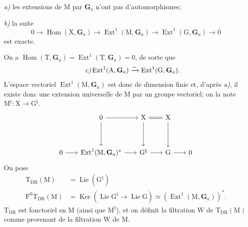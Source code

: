 \documentclass[11pt,leqno]{article}
\begin{document}
\noindent \textit{a)} les extensions de \(\mathrm{M}\) par
\(\mathbf{G}_a\) n’ont pas d’automorphismes;\par
\noindent \textit{b)} la suite
\[
0\to\operatorname{Hom}(\mathrm{X},\mathbf{G}_a)
\to\operatorname{Ext}^1(\mathrm{M},\mathbf{G}_a)
\to\operatorname{Ext}^1(\mathrm{G},\mathbf{G}_a)\to0
\]
est exacte.

On a
\(\operatorname{Hom}(\mathrm{T},\mathbf{G}_a)
=\operatorname{Ext}^1(\mathrm{T},\mathbf{G}_a)=0\), de sorte que
\[
\tag*{\textit{c)}}
\operatorname{Ext}^1(\mathrm{A},\mathbf{G}_a)
\xrightarrow{\sim}
\operatorname{Ext}^1(\mathrm{G},\mathbf{G}_a).
\]
L’espace vectoriel \(\operatorname{Ext}^1(\mathrm{M},\mathbf{G}_a)\)
est donc de dimension finie et, d’après \textit{a)}, il existe donc une
extension universelle de \(\mathrm{M}\) par un groupe vectoriel;
on la note \(\mathrm{M}^{\natural}:\mathrm{X}\to\mathrm{G}^{\natural}\).
\[
\begin{tikzcd}[column sep=1.8em, row sep=3.5em]
&
0 \arrow[r] \arrow[d]
&
\mathrm{X} \arrow[r, equal] \arrow[d]
&
\mathrm{X} \arrow[d]
&
\\
0 \arrow[r]
&
\operatorname{Ext}^1(\mathrm{M},\mathbf{G}_a)^* \arrow[r]
&
\mathrm{G}^{\natural} \arrow[r]
&
\mathrm{G} \arrow[r]
&
0
\end{tikzcd}
\]
On pose
\[
\begin{aligned}
\mathrm{T}_{\mathrm{DR}}(\mathrm{M})
  &=\operatorname{Lie}(\mathrm{G}^{\natural})
\\
\mathrm{F}^0\mathrm{T}_{\mathrm{DR}}(\mathrm{M})
  &=\operatorname{Ker}
    (\operatorname{Lie}\mathrm{G}^{\natural}\to\operatorname{Lie}\mathrm{G})
    \simeq(\operatorname{Ext}^1(\mathrm{M},\mathbf{G}_a))^*.
\end{aligned}
\]
\(\mathrm{T}_{\mathrm{DR}}\) est fonctoriel en \(\mathrm{M}\)
(ainsi que \(\mathrm{M}^{\natural}\)), et on définit la filtration
\(\mathrm{W}\) de \(\mathrm{T}_{\mathrm{DR}}(\mathrm{M})\) comme
provenant de la filtration \(\mathrm{W}\) de \(\mathrm{M}\).
\end{document}
